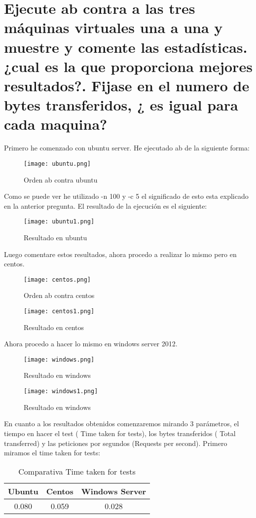 \section{Ejecute ab contra a las tres máquinas virtuales una a una y muestre y comente las estadísticas.¿cual es la que proporciona mejores resultados?. Fijase en el numero de bytes transferidos, ¿ es igual para cada maquina?}
Primero he comenzado con ubuntu server. He ejecutado ab de la siguiente forma:
\begin{figure}[H] 
\centering
\texttt{[image: ubuntu.png]}  
\label{figura12:}
\caption{Orden ab contra ubuntu}
\end{figure}
Como se puede ver he utilizado -n 100 y -c 5 el significado de esto esta explicado en la anterior pregunta. El resultado de la ejecución es el siguiente:
\begin{figure}[H] 
\centering
\texttt{[image: ubuntu1.png]}  
\label{figura13:}
\caption{Resultado en ubuntu}
\end{figure}
Luego comentare estos resultados, ahora procedo a realizar lo mismo pero en centos.
\begin{figure}[H] 
\centering
\texttt{[image: centos.png]}  
\label{figura14:}
\caption{Orden ab contra centos}
\end{figure}
\begin{figure}[H] 
\centering
\texttt{[image: centos1.png]}  
\label{figura15:}
\caption{Resultado en centos}
\end{figure}
Ahora procedo a hacer lo mismo en windows server 2012.
\begin{figure}[H] 
\centering
\texttt{[image: windows.png]}  
\label{figura16:}
\caption{Resultado en windows}
\end{figure}
\begin{figure}[H] 
\centering
\texttt{[image: windows1.png]}  
\label{figura17:}
\caption{Resultado en windows}
\end{figure}
En cuanto a los resultados obtenidos comenzaremos mirando 3 parámetros, el tiempo en hacer el test ( Time taken for tests), los bytes transferidos ( Total transferred) y las peticiones por segundos (Requests per second).
Primero miramos el time taken for tests:
\begin{table}[H]
\centering
\begin{tabular}{|c|c|c|}
\hline
{\bf Ubuntu} & {\bf Centos} & {\bf Windows Server} \\
\hline
0.080 & 0.059 & 0.028 \\
\hline
\end{tabular}  
\caption{Comparativa Time taken for tests} \label{tab:tabla1}
\end{table} 

